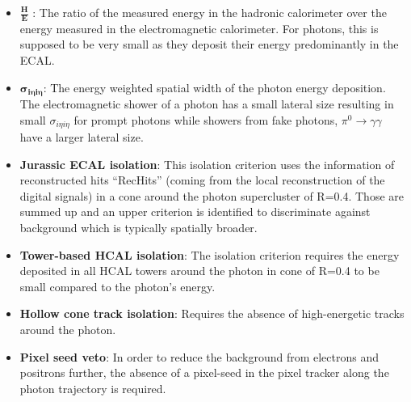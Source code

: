 \begin{itemize}
 \item $\frac{\textbf{H}}{\textbf{E}}$ : The ratio of the measured energy in the hadronic calorimeter over the energy measured in the electromagnetic calorimeter. 
                                                    For photons, this is supposed to be very small as they deposit their energy predominantly in the ECAL.
 \item $\mathbold{\sigma_{i\eta i \eta}}$: The energy weighted spatial width of the photon energy deposition. The electromagnetic shower of a photon has a small lateral size 
                                           resulting in small $\sigma_{i\eta i \eta}$ for prompt photons while showers from fake photons, \eg $\pi^{0} \rightarrow \gamma \gamma$
                                           have a larger lateral size.
 \item \textbf{Jurassic ECAL isolation}: This isolation criterion uses the information of reconstructed hits ``RecHits'' (coming from the local reconstruction of the digital signals) 
                                         in a cone around the photon supercluster of R=0.4. Those are summed up and an upper criterion is identified to discriminate against 
                                         background which is typically spatially broader.  
 \item \textbf{Tower-based HCAL isolation}: The isolation criterion requires the energy deposited in all HCAL towers around the photon in cone of R=0.4 to be small compared to the 
                                            photon's energy. 
 \item \textbf{Hollow cone track isolation}: Requires the absence of high-energetic tracks around the photon.
 \item \textbf{Pixel seed veto}: In order to reduce the background from electrons and positrons further, the absence of a pixel-seed in the pixel tracker along the photon trajectory is required.
\end{itemize}

